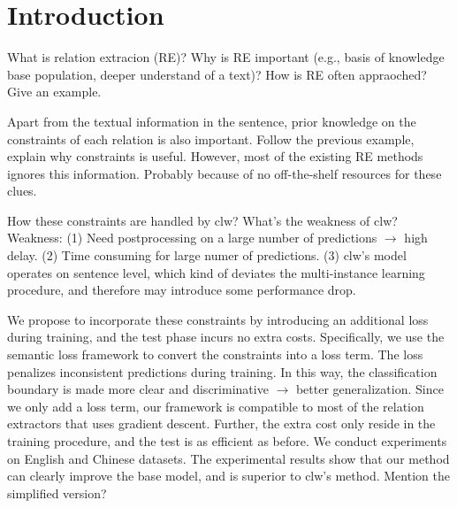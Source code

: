 \section{Introduction}

What is relation extracion (RE)?
Why is RE important (e.g., basis of knowledge base population, deeper understand of a text)?
How is RE often appraoched? Give an example.


Apart from the textual information in the sentence, prior knowledge on the constraints of each relation is also important.
Follow the previous example, explain why constraints is useful.
However, most of the existing RE methods ignores this information.
Probably because of no off-the-shelf resources for these clues.

How these constraints are handled by clw?
What's the weakness of clw? 
Weakness: 
(1) Need postprocessing on a large number of predictions $\rightarrow$ high delay.
(2) Time consuming for large numer of predictions.
(3) clw's model operates on sentence level, which kind of deviates the multi-instance learning procedure, and therefore may introduce some performance drop.

We propose to incorporate these constraints by introducing an additional loss during training, and the test phase incurs no extra costs.
Specifically, we use the semantic loss framework to convert the constraints into a loss term.
The loss penalizes inconsistent predictions during training.
In this way, the classification boundary is made more clear and discriminative $\rightarrow$ better generalization.
Since we only add a loss term, our framework is compatible to most of the relation extractors that uses gradient descent.
Further, the extra cost only reside in the training procedure, and the test is as efficient as before.
We conduct experiments on English and Chinese datasets.
The experimental results show that our method can clearly improve the base model, and is superior to clw's method.
Mention the simplified version?

